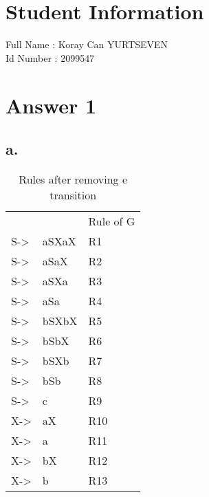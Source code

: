 \documentclass[12pt]{article}
\begin{document}
\section*{Student Information } 
Full Name : Koray Can YURTSEVEN \\
Id Number : 2099547 \\

\section*{Answer 1}

\subsection*{a.}

\begin{table}[H]
\centering
\caption{Rules after removing e transition}
\begin{tabular}{lll}
                 &       & Rule of G \\
S-\textgreater{} & aSXaX & R1        \\
S-\textgreater{} & aSaX  & R2        \\
S-\textgreater{} & aSXa  & R3        \\
S-\textgreater{} & aSa   & R4        \\
S-\textgreater{} & bSXbX & R5        \\
S-\textgreater{} & bSbX  & R6        \\
S-\textgreater{} & bSXb  & R7        \\
S-\textgreater{} & bSb   & R8        \\
S-\textgreater{} & c     & R9        \\
X-\textgreater{} & aX    & R10       \\
X-\textgreater{} & a     & R11       \\
X-\textgreater{} & bX    & R12       \\
X-\textgreater{} & b     & R13      
\end{tabular}
\end{table}
\end{document}
